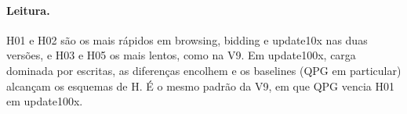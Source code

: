 \paragraph{Leitura.} H01 e H02 são os mais rápidos em browsing, bidding e update10x nas duas versões, e H03 e H05 os mais lentos, como na V9. Em update100x, carga dominada por escritas, as diferenças encolhem e os baselines (QPG em particular) alcançam os esquemas de H. É o mesmo padrão da V9, em que QPG vencia H01 em update100x.

